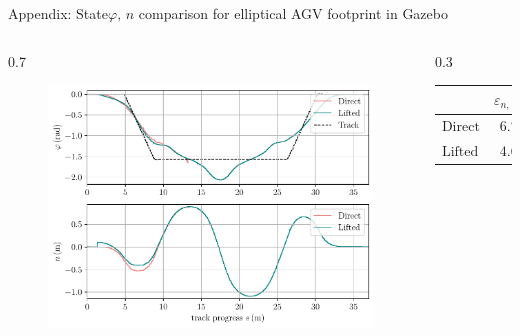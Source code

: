 \documentclass[10pt,aspectratio=1610]{beamer} %
\begin{document}
\begin{frame}{Appendix: State$\varphi,\,n$ comparison for elliptical AGV footprint in Gazebo}
	\begin{columns}
		\begin{column}{0.7\textwidth}
	\begin{figure}[h!tbp]
	\includegraphics[scale=0.65]{figures/zeta_phi_n_el}
\end{figure}
\end{column}
\begin{column}{0.3\textwidth}
	\begin{table}[h!tbp]
		\small
		\begin{center}
			\begin{tabular}{lccccl}\toprule
				& $\varepsilon_{n,\,\mathrm{avg}}\,(\mathrm{m})$\\
				\midrule
				$\mathrm{Direct}$& $6.78\cdot10^{-1}$\\
				$\mathrm{Lifted}$& $4.67\cdot10^{-1}$\\
				\bottomrule
			\end{tabular}
		\end{center}
	\end{table}
\end{column}
\end{columns}
\end{frame}
\end{document}
